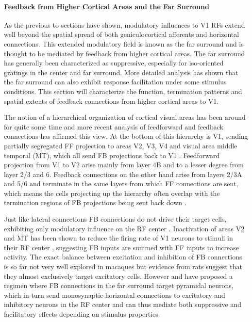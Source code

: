 \paragraph{Feedback from Higher Cortical Areas and the Far Surround}

As the previous to sections have shown, modulatory influences to V1
RFs extend well beyond the spatial spread of both geniculocortical
afferents and horizontal connections. This extended modulatory field
is known as the far surround and is thought to be mediated by feedback
from higher cortical areas. The far surround has generally been
characterized as suppressive, especially for iso-oriented gratings in
the center and far surround. More detailed analysis has shown that the
far surround can also exhibit response facilitation under some
stimulus conditions. This section will characterize the function,
termination patterns and spatial extents of feedback connections from
higher cortical areas to V1.

The notion of a hierarchical organization of cortical visual areas has
been around for quite some time and more recent analysis of
feedforward and feedback connections has affirmed this view. At the
bottom of this hierarchy is V1, sending partially segregated FF
projection to areas V2, V3, V4 and visual area middle temporal (MT),
which all send FB projections back to V1
\citep{Felleman1991}. Feedforward projection from V1 to V2 arise
mainly from layer 4B and to a lesser degree from layer 2/3 and
6. Feedback connections on the other hand arise from layers 2/3A and
5/6 and terminate in the same layers from which FF connections are
sent, which means the cells projecting up the hierarchy often overlap
with the termination regions of FB projections being sent back down
\citep{Angelucci2002}.

Just like lateral connections FB connections do not drive their target
cells, exhibiting only modulatory influence on the RF center
\citep{Bullier2001a}. Inactivation of areas V2 and MT has been shown
to reduce the firing rate of V1 neurons to stimuli in their RF center
\citep{Hupe1998}, suggesting FB inputs are summed with FF inputs to
increase activity. The exact balance between excitation and inhibition
of FB connections is so far not very well explored in macaques but
evidence from rats suggest that they almost exclusively target
excitatory cells. However \cite{Angelucci2006} and \cite{Schwabe2006}
have proposed a regimen where FB connections in the far surround
target pyramidal neurons, which in turn send monosynaptic horizontal
connections to excitatory and inhibitory neurons in the RF center and
can thus mediate both suppressive and facilitatory effects depending
on stimulus properties.

